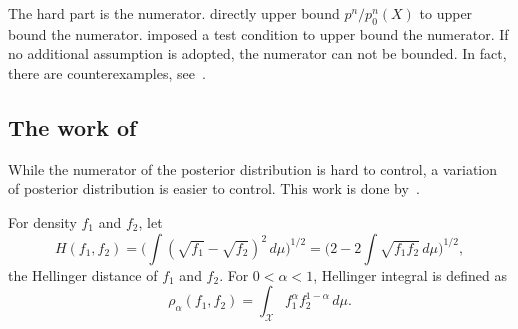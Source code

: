 \documentclass[11pt, letterpaper]{article}
\theoremstyle{plain}
\theoremstyle{definition}
\theoremstyle{remark}
\begin{document}
The hard part is the numerator.
\cite{Shen2001Rates} directly upper bound $p^n/p_0^n (X)$ to upper bound the numerator.
\cite{Ghosal2000Asymptotic} imposed a test condition to upper bound the numerator.
If no additional assumption is adopted, the numerator can not be bounded.
In fact, there are counterexamples, see~\cite{diaconis1986consistency}.
\subsection{The work of~\cite{kar10563}}
While the numerator of the posterior distribution is hard to control, a variation of posterior distribution is easier to control.
This work is done by~\cite{kar10563}.

For density $f_1$ and $f_2$, let
$$H(f_1,f_2)=\Big(\int(\sqrt{f_1}-\sqrt{f_2})^2 \, d \mu\Big)^{1/2}=\Big(2-2\int \sqrt{f_1 f_2}\, d \mu \Big)^{1/2},$$
the Hellinger distance of $f_1$ and $f_2$.
For $0<\alpha<1$, Hellinger integral is defined as
$$
\rho_{\alpha}(f_1,f_2)=\int_{\mathcal{X}} f_1^{\alpha} f_2^{1-\alpha} \, d \mu.
$$
\end{document}
